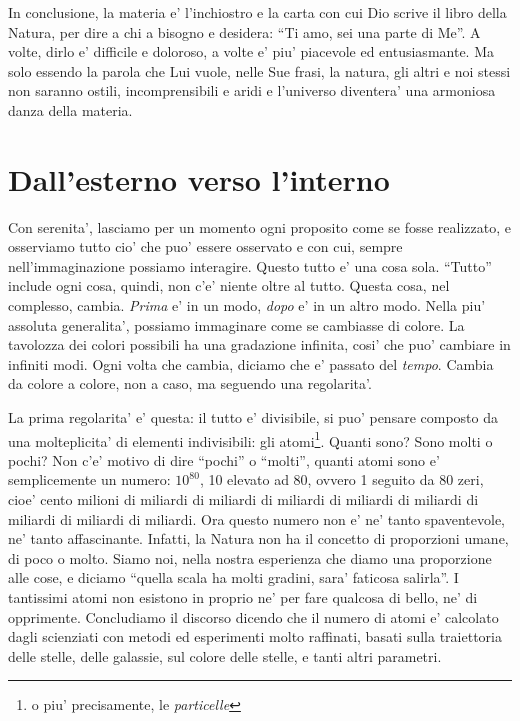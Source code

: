 In conclusione, la materia e' l'inchiostro e la carta con cui Dio scrive il libro della Natura, per dire a chi a bisogno e desidera: ``Ti amo, sei una parte di Me''. A volte, dirlo e' difficile e doloroso, a volte e' piu' piacevole ed entusiasmante. Ma solo essendo la parola che Lui vuole, nelle Sue frasi, la natura, gli altri e noi stessi non saranno ostili, incomprensibili e aridi e l'universo diventera' una armoniosa danza della materia.

\section{Dall'esterno verso l'interno}
\label{extInt}

Con serenita', lasciamo per un momento ogni proposito come se fosse realizzato, e osserviamo tutto cio' che puo' essere osservato e con cui, sempre nell'immaginazione possiamo interagire. Questo tutto e' una cosa sola. ``Tutto'' include ogni cosa, quindi, non c'e' niente oltre al tutto.
Questa cosa, nel complesso, cambia. \emph{Prima} e' in un modo, \emph{dopo} e' in un altro modo. Nella piu' assoluta generalita', possiamo immaginare come se cambiasse di colore. La tavolozza dei colori possibili ha una gradazione infinita, cosi' che puo' cambiare in infiniti modi. Ogni volta che cambia, diciamo che e' passato del \emph{tempo}. Cambia da colore a colore, non a caso, ma seguendo una regolarita'. 

La prima regolarita' e' questa: il tutto e' divisibile, si puo' pensare composto da una molteplicita' di elementi indivisibili: gli atomi\footnote{o piu' precisamente, le \emph{particelle}}.
Quanti sono? Sono molti o pochi? Non c'e' motivo di dire ``pochi'' o ``molti'', quanti atomi sono  e' semplicemente un numero: $10^{80}$, 10 elevato ad 80, ovvero 1 seguito da 80 zeri, cioe' cento milioni di miliardi di miliardi di miliardi di miliardi di miliardi di miliardi di miliardi di miliardi. 
Ora questo numero non e' ne' tanto spaventevole, ne' tanto affascinante. Infatti, la Natura non ha il concetto di proporzioni umane, di poco o molto. Siamo noi, nella nostra esperienza che diamo una proporzione alle cose, e diciamo ``quella scala ha molti gradini, sara' faticosa salirla''. 
I tantissimi atomi non esistono in proprio ne' per fare qualcosa di bello, ne' di opprimente.
Concludiamo il discorso dicendo che il numero di atomi e' calcolato dagli scienziati con metodi ed esperimenti molto raffinati, basati sulla traiettoria delle stelle, delle galassie, sul colore delle stelle, e tanti altri parametri.

